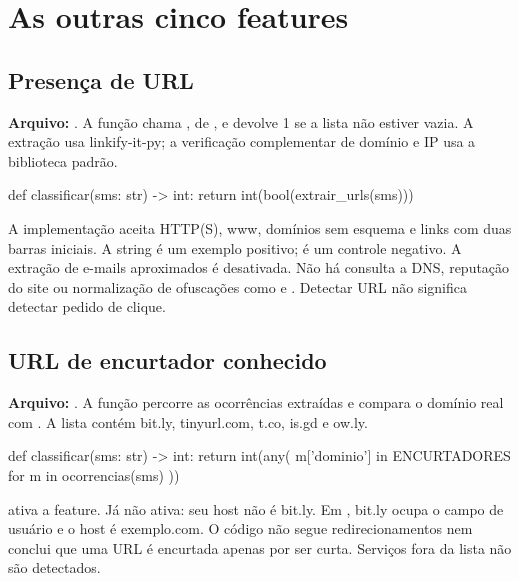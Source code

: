 \section{As outras cinco features}
\subsection{Presença de URL}
\textbf{Arquivo:} . A função  chama , de , e devolve 1 se a lista não estiver vazia. A extração usa linkify-it-py; a verificação complementar de domínio e IP usa a biblioteca padrão.

\begin{codigofonte}
def classificar(sms: str) -> int:
    return int(bool(extrair_urls(sms)))
\end{codigofonte}

A implementação aceita HTTP(S), www, domínios sem esquema e links com duas barras iniciais. A string  é um exemplo positivo;  é um controle negativo. A extração de e-mails aproximados é desativada. Não há consulta a DNS, reputação do site ou normalização de ofuscações como  e \termotecnico{[.]}. Detectar URL não significa detectar pedido de clique.

\subsection{URL de encurtador conhecido}
\textbf{Arquivo:} . A função  percorre as ocorrências extraídas e compara o domínio real com . A lista contém bit.ly, tinyurl.com, t.co, is.gd e ow.ly.

\begin{codigofonte}
def classificar(sms: str) -> int:
    return int(any(
        m['dominio'] in ENCURTADORES
        for m in ocorrencias(sms)
    ))
\end{codigofonte}

 ativa a feature. Já  não ativa: seu host não é bit.ly. Em , bit.ly ocupa o campo de usuário e o host é exemplo.com. O código não segue redirecionamentos nem conclui que uma URL é encurtada apenas por ser curta. Serviços fora da lista não são detectados.

